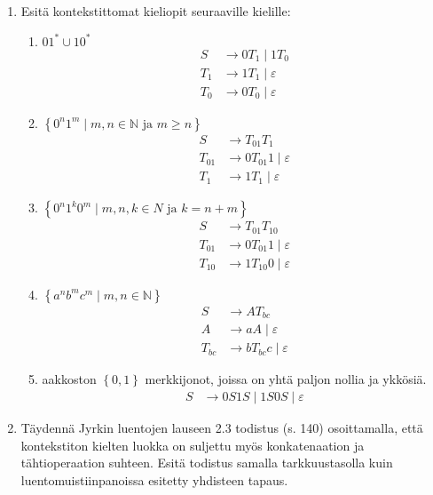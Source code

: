 \documentclass[a4paper,11pt]{article}
\newcommand{\set}[1]{{\left\{ #1 \right\}}}
\newcommand{\Nat}{\mathbb{N}}
\begin{document}
\begin{enumerate}
\item
  Esitä kontekstittomat  kieliopit seuraaville kielille:
  \begin{enumerate}
  \item $01^\ast\cup10^\ast$
    \begin{align*}
      S   & \to 0T_1 \mid 1T_0 \\
      T_1 & \to 1T_1 \mid \varepsilon \\
      T_0 & \to 0T_0 \mid \varepsilon
    \end{align*}
  \item $\set{0^n1^m\mid\mbox{$m,n\in \Nat$ ja $m\geq n$}}$
    \begin{align*}
      S      & \to T_{01} T_1 \\
      T_{01} & \to 0T_{01}1 \mid \varepsilon \\
      T_{1}  & \to 1T_1 \mid \varepsilon
    \end{align*}
  \item $\set{0^n1^k0^m\mid\mbox{$m,n,k\in N$ ja $k=n+m$}}$
    \begin{align*}
      S      & \to T_{01} T_{10} \\
      T_{01} & \to 0T_{01}1 \mid \varepsilon \\
      T_{10} & \to 1T_{10}0 \mid \varepsilon
    \end{align*}
  \item $\set{a^n b^m c^m\mid m,n\in \Nat}$
    \begin{align*}
      S      & \to AT_{bc} \\
      A      & \to aA       \mid \varepsilon \\
      T_{bc} & \to bT_{bc}c \mid \varepsilon
    \end{align*}
  \item
    aakkoston $\set{0,1}$ merkkijonot, joissa on yhtä paljon nollia ja
    ykkösiä.
    \begin{align*}
      S & \to 0S1S \mid 1S0S \mid \varepsilon
    \end{align*}
  \end{enumerate}

\item
  Täydennä Jyrkin luentojen lauseen 2.3 todistus (s. 140)
  osoittamalla, että kontekstiton kielten luokka on suljettu myös
  konkatenaation ja tähtioperaation suhteen. Esitä todistus samalla
  tarkkuustasolla kuin luentomuistiinpanoissa esitetty yhdisteen
  tapaus.
  

\end{enumerate}
\end{document}
